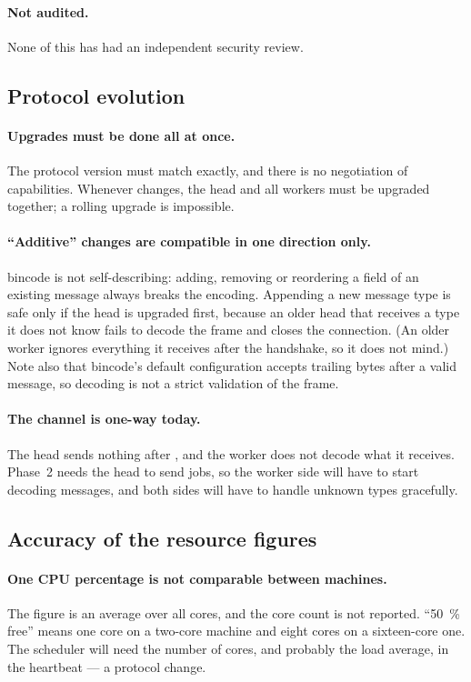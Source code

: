 \documentclass{article}
\begin{document}
\paragraph{Not audited.}
None of this has had an independent security review.

\subsection{Protocol evolution}
\label{sec:lim-protocol}

\paragraph{Upgrades must be done all at once.}
The protocol version must match exactly, and there is no negotiation of
capabilities. Whenever  changes, the head and all
workers must be upgraded together; a rolling upgrade is impossible.

\paragraph{``Additive'' changes are compatible in one direction only.}
bincode is not self-describing: adding, removing or reordering a field of
an existing message always breaks the encoding. Appending a new message
type is safe only if the head is upgraded first, because an older head
that receives a type it does not know fails to decode the frame and
closes the connection. (An older worker ignores everything it receives
after the handshake, so it does not mind.) Note also that bincode's
default configuration accepts trailing bytes after a valid message, so
decoding is not a strict validation of the frame.

\paragraph{The channel is one-way today.}
The head sends nothing after , and the worker does not
decode what it receives. Phase~2 needs the head to send jobs, so the
worker side will have to start decoding messages, and both sides will
have to handle unknown types gracefully.

\subsection{Accuracy of the resource figures}

\paragraph{One CPU percentage is not comparable between machines.}
The figure is an average over all cores, and the core count is not
reported. ``50~\% free'' means one core on a two-core machine and eight
cores on a sixteen-core one. The scheduler will need the number of cores,
and probably the load average, in the heartbeat --- a protocol change.
\end{document}
